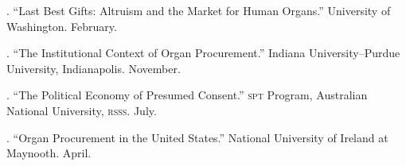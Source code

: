 \documentclass[11pt]{article}
\begin{document}
. ``Last Best Gifts: Altruism and the Market for Human 
Organs.'' University of Washington. February. 

. ``The Institutional Context of Organ Procurement.'' Indiana
University--Purdue University, Indianapolis. November.

. ``The Political Economy of Presumed Consent.'' \textsc{spt} Program,
Australian National University, \textsc{rsss}. July. 

. ``Organ Procurement in the United States.'' National University of
Ireland at Maynooth. April. 

% 
% 
% 
% 
% 
% 
% 
% 
% 
% 
% 
% 
% 
% 
% 
% 
% 
% 
% 
% 
% 

\bigskip


\medskip
\end{document}

